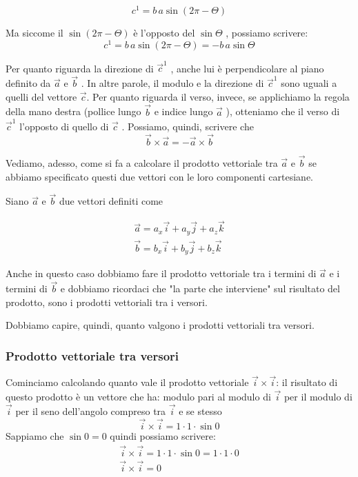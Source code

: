 \documentclass[a4paper]{book}
\begin{document}
$$ c^{1} = b\, a \sin(2 \pi - \Theta) $$

Ma siccome il $ \sin(2 \pi - \Theta) $ è l'opposto del $ \sin \Theta $ , possiamo scrivere:
$$ c^{1} = b\, a \sin(2 \pi - \Theta) = -b \, a \sin \Theta $$

Per quanto riguarda la direzione di $ \overrightarrow{c}^{1} $ , anche lui è perpendicolare al piano definito da $ \overrightarrow{a} $ e $ \overrightarrow{b} $ .
In altre parole, il modulo e la direzione di $ \overrightarrow{c}^{1} $ sono uguali a quelli del vettore $ \overrightarrow{c} $. Per quanto riguarda il verso, invece, se applichiamo la regola della mano destra (pollice lungo $\overrightarrow{b} $ e indice lungo $ \overrightarrow{a} $ ), otteniamo che il verso di $\overrightarrow{c}^{1} $ l'opposto di quello di $\overrightarrow{c} $ . Possiamo, quindi, scrivere che
$$ \overrightarrow{b} \times \overrightarrow{a} = - \overrightarrow{a} \times \overrightarrow{b} $$

Vediamo, adesso, come si fa a calcolare il prodotto vettoriale tra $ \overrightarrow{a} $ e $ \overrightarrow{b} $ se abbiamo specificato questi due vettori con le loro componenti cartesiane.

Siano $ \overrightarrow{a} $ e $\overrightarrow{b} $ due vettori definiti come

\begin{align*}
\overrightarrow{a} = a_{x} \overrightarrow{i} + a_{y} \overrightarrow{j} + a_{z}\overrightarrow{k} \\
\overrightarrow{ b} = b_{x} \overrightarrow{i} + b_{y} \overrightarrow{j} + b_{z} \overrightarrow{k} 
\end{align*}

Anche in questo caso dobbiamo fare il prodotto vettoriale tra i termini di $\overrightarrow{a} $ e i termini di $ \overrightarrow{b} $ e dobbiamo ricordaci che "la parte che interviene" sul risultato del prodotto, sono i prodotti vettoriali tra i versori.

Dobbiamo capire, quindi, quanto valgono i prodotti vettoriali tra versori.

\subsubsection{Prodotto vettoriale tra versori}
Cominciamo calcolando quanto vale il prodotto vettoriale $ \overrightarrow{i} \times \overrightarrow{i} $: il risultato di questo prodotto è un vettore che ha:
modulo pari al modulo di $\overrightarrow{i} $ per il modulo di $ \overrightarrow{i} $ per il seno dell'angolo compreso tra $ \overrightarrow{i} $ e se stesso
$$ \overrightarrow{i} \times \overrightarrow{i} = 1 \cdot 1 \cdot \sin 0 $$
Sappiamo che $ \sin 0 = 0 $ quindi possiamo scrivere:
\begin{align*}
	\overrightarrow{i} \times \overrightarrow{i} = 1 \cdot 1 \cdot \sin 0 = 1 \cdot 1 \cdot 0 \\
	\overrightarrow{i} \times \overrightarrow{i} = 0
\end{align*}
\end{document}
